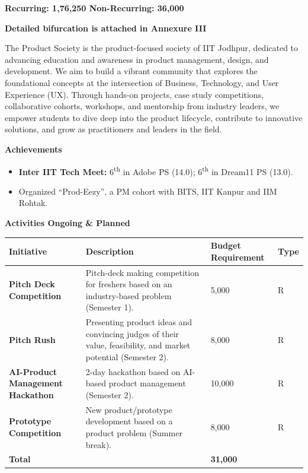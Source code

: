 \documentclass[11pt,letterpaper]{article}
\newcommand{\rs}{{\rupee}}
\newcommand{\society}[1]{\par\bigskip{\sffamily\bfseries\large #1}\par}
\newcommand{\subhead}[1]{\par{\bfseries #1}\par}
\begin{document}
\textbf{Recurring: \rs1,76,250 \quad Non-Recurring: \rs36,000}

\textbf{Detailed bifurcation is attached in Annexure III}

\clearpage
\society{4.\ \ Product Society}

The Product Society is the product-focused society of IIT Jodhpur, dedicated to advancing education and awareness in product management, design, and development. We aim to build a vibrant community that explores the foundational concepts at the intersection of Business, Technology, and User Experience (UX). Through hands-on projects, case study competitions, collaborative cohorts, workshops, and mentorship from industry leaders, we empower students to dive deep into the product lifecycle, contribute to innovative solutions, and grow as practitioners and leaders in the field.

\subhead{Achievements}
\begin{itemize}
  \item \textbf{Inter IIT Tech Meet:} 6\textsuperscript{th} in Adobe PS (14.0); 6\textsuperscript{th} in Dream11 PS (13.0).
  \item Organized ``Prod-Eezy'', a PM cohort with BITS, IIT Kanpur and IIM Rohtak.
\end{itemize}

\subhead{Activities Ongoing \& Planned}
\begin{longtable}{|L{0.25\textwidth}|L{0.40\textwidth}|C{0.17\textwidth}|C{0.06\textwidth}|}
\hline
\textbf{Initiative} & \textbf{Description} & \textbf{Budget Requirement} & \textbf{Type}\\ \hline
\textbf{Pitch Deck Competition} & Pitch-deck making competition for freshers based on an industry-based problem (Semester 1). & \rs5,000 & R\\ \hline
\textbf{Pitch Rush} & Presenting product ideas and convincing judges of their value, feasibility, and market potential (Semester 2). & \rs8,000 & R\\ \hline
\textbf{AI-Product Management Hackathon} & 2-day hackathon based on AI-based product management (Semester 2). & \rs10,000 & R\\ \hline
\textbf{Prototype Competition} & New product/prototype development based on a product problem (Summer break). & \rs8,000 & R\\ \hline
\textbf{Total} & & \textbf{\rs31,000} & \\ \hline
\end{longtable}
\end{document}

